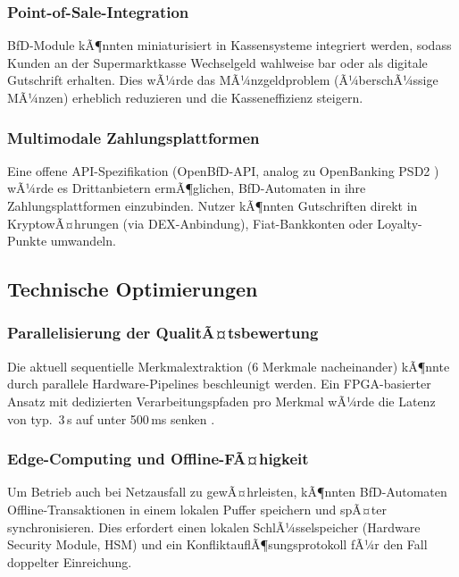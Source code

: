 ﻿\documentclass[a4paper,12pt]{article}
\theoremstyle{definition}
\begin{document}
\subsubsection{Point-of-Sale-Integration}

BfD-Module kÃ¶nnten miniaturisiert in Kassensysteme integriert werden,
sodass Kunden an der Supermarktkasse Wechselgeld wahlweise bar oder als
digitale Gutschrift erhalten.  Dies wÃ¼rde das MÃ¼nzgeldproblem (Ã¼berschÃ¼ssige
MÃ¼nzen) erheblich reduzieren und die Kasseneffizienz steigern.

\subsubsection{Multimodale Zahlungsplattformen}

Eine offene API-Spezifikation (OpenBfD-API, analog zu OpenBanking PSD2 \cite{psd2})
wÃ¼rde es Drittanbietern ermÃ¶glichen, BfD-Automaten in ihre Zahlungsplattformen
einzubinden.  Nutzer kÃ¶nnten Gutschriften direkt in KryptowÃ¤hrungen
(via DEX-Anbindung), Fiat-Bankkonten oder Loyalty-Punkte umwandeln.

\subsection{Technische Optimierungen}

\subsubsection{Parallelisierung der QualitÃ¤tsbewertung}

Die aktuell sequentielle Merkmalextraktion (6 Merkmale nacheinander) kÃ¶nnte
durch parallele Hardware-Pipelines beschleunigt werden.  Ein FPGA-basierter
Ansatz mit dedizierten Verarbeitungspfaden pro Merkmal wÃ¼rde die Latenz
von typ.\ 3\,s auf unter 500\,ms senken \cite{kuon2006measuring}.

\subsubsection{Edge-Computing und Offline-FÃ¤higkeit}

Um Betrieb auch bei Netzausfall zu gewÃ¤hrleisten, kÃ¶nnten BfD-Automaten
Offline-Transaktionen in einem lokalen Puffer speichern und spÃ¤ter
synchronisieren.  Dies erfordert einen lokalen SchlÃ¼sselspeicher (Hardware
Security Module, HSM) und ein KonfliktauflÃ¶sungsprotokoll fÃ¼r den Fall
doppelter Einreichung.
\end{document}
